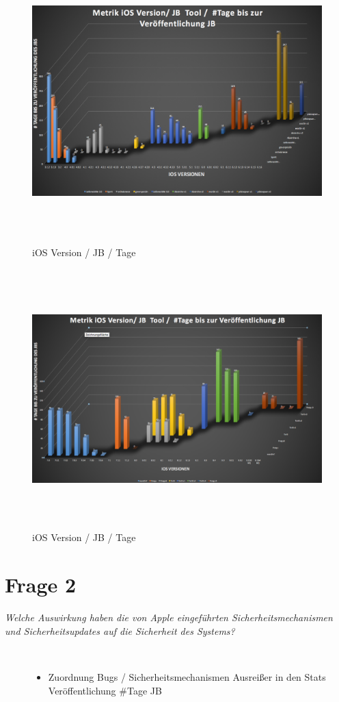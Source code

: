 \begin{figure}[htbp]
        \centering
                \includegraphics[height=11cm]{Bilder/Frage1_1.png}
        \caption{iOS Version / JB / Tage}
        \label{fig:AnalyseiOSJB1}        
\end{figure}

\begin{figure}[htbp]
        \centering
                \includegraphics[height=10cm]{Bilder/Frage1_2.png}
        \caption{iOS Version / JB / Tage}
        \label{fig:AnalyseiOSJB2}
\end{figure}

\section{Frage 2}
\label{sec:Frage2}
\textit{\glqq Welche Auswirkung haben die von Apple eingeführten Sicherheitsmechanismen und Sicherheitsupdates auf die Sicherheit des Systems?\grqq{}} 
            
     
\begin{description}
    \item[\parbox{\textwidth} {Antwort kurz INFO Katharina}]~\par
        \begin{itemize}
                \item Zuordnung Bugs / Sicherheitsmechanismen Ausreißer in den Stats Veröffentlichung \#Tage JB  
        \end{itemize}
\end{description} 
        




 